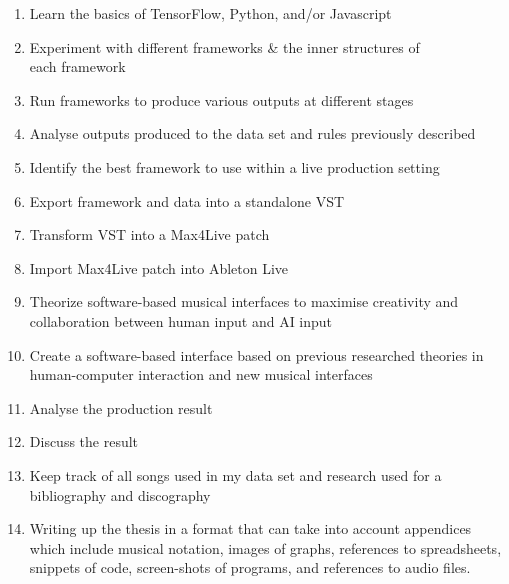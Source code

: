 \documentclass{article}
\begin{document}
\begin{enumerate}
    \item Learn the basics of TensorFlow, Python, and/or Javascript
    \item Experiment with different frameworks \& the inner structures of \\each framework
    \item Run frameworks to produce various outputs at different stages
    \item Analyse outputs produced to the data set and rules previously described
    \item Identify the best framework to use within a live production setting
    \item Export framework and data into a standalone VST
    \item Transform VST into a Max4Live patch
    \item Import Max4Live patch into Ableton Live
    \item Theorize software-based musical interfaces to maximise creativity and collaboration between human input and AI input
    \item Create a software-based interface based on previous researched theories in human-computer interaction and new musical interfaces
    \item Analyse the production result
    \item Discuss the result
    \item Keep track of all songs used in my data set and research used for a bibliography and discography
    \item Writing up the thesis in a format that can take into account appendices which include musical notation, images of graphs, references to spreadsheets, snippets of code, screen-shots of programs, and references to audio files.
\end{enumerate}
\end{document}
